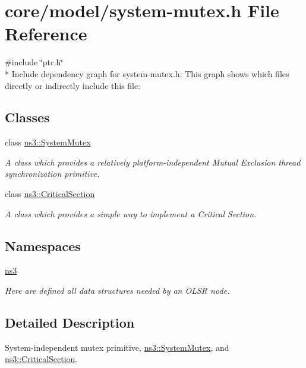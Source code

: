 \hypertarget{system-mutex_8h}{}\section{core/model/system-\/mutex.h File Reference}
\label{system-mutex_8h}
{\ttfamily \#include \char`\"{}ptr.\+h\char`\"{}}\\*
Include dependency graph for system-\/mutex.h\+:
This graph shows which files directly or indirectly include this file\+:
\subsection*{Classes}
\begin{DoxyCompactItemize}
\item 
class \hyperlink{classns3_1_1SystemMutex}{ns3\+::\+System\+Mutex}
\begin{DoxyCompactList}\small\item\em A class which provides a relatively platform-\/independent Mutual Exclusion thread synchronization primitive. \end{DoxyCompactList}\item 
class \hyperlink{classns3_1_1CriticalSection}{ns3\+::\+Critical\+Section}
\begin{DoxyCompactList}\small\item\em A class which provides a simple way to implement a Critical Section. \end{DoxyCompactList}\end{DoxyCompactItemize}
\subsection*{Namespaces}
\begin{DoxyCompactItemize}
\item 
 \hyperlink{namespacens3}{ns3}
\begin{DoxyCompactList}\small\item\em Here are defined all data structures needed by an O\+L\+SR node. \end{DoxyCompactList}\end{DoxyCompactItemize}


\subsection{Detailed Description}
System-\/independent mutex primitive, \hyperlink{classns3_1_1SystemMutex}{ns3\+::\+System\+Mutex}, and \hyperlink{classns3_1_1CriticalSection}{ns3\+::\+Critical\+Section}. 